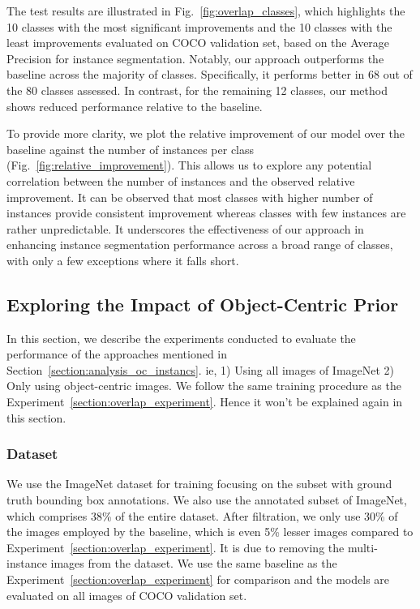 The test results are illustrated in Fig.~\ref{fig:overlap_classes}, which highlights the 10 classes with the most significant improvements and the 10 classes with the least improvements evaluated on COCO validation set, based on the Average Precision for instance segmentation. Notably, our approach outperforms the baseline across the majority of classes. Specifically, it performs better in 68 out of the 80 classes assessed. In contrast, for the remaining 12 classes, our method shows reduced performance relative to the baseline.

To provide more clarity, we plot the relative improvement of our model over the baseline against the number of instances per class (Fig.~\ref{fig:relative_improvement}). This allows us to explore any potential correlation between the number of instances and the observed relative improvement. It can be observed that most classes with higher number of instances provide consistent improvement whereas classes with few instances are rather unpredictable. It underscores the effectiveness of our approach in enhancing instance segmentation performance across a broad range of classes, with only a few exceptions where it falls short.

\subsection{Exploring the Impact of Object-Centric Prior}
\label{section:obj_centic_prior_exp}
In this section, we describe the experiments conducted to evaluate the performance of the approaches mentioned in Section~\ref{section:analysis_oc_instancs}. ie, 1) Using all images of ImageNet 2) Only using object-centric images. We follow the same training procedure as the Experiment~\ref{section:overlap_experiment}. Hence it won't be explained again in this section.

\subsubsection{Dataset}
We use the ImageNet dataset for training focusing on the subset with ground truth bounding box annotations. We  also use the annotated subset of ImageNet, which comprises 38\% of the entire dataset. After filtration, we only use 30\% of the images employed by the baseline, which is even 5\% lesser images compared to Experiment~\ref{section:overlap_experiment}. It is due to removing the multi-instance images from the dataset. We use the same baseline as the Experiment~\ref{section:overlap_experiment} for comparison and the models are evaluated on all images of COCO validation set.

